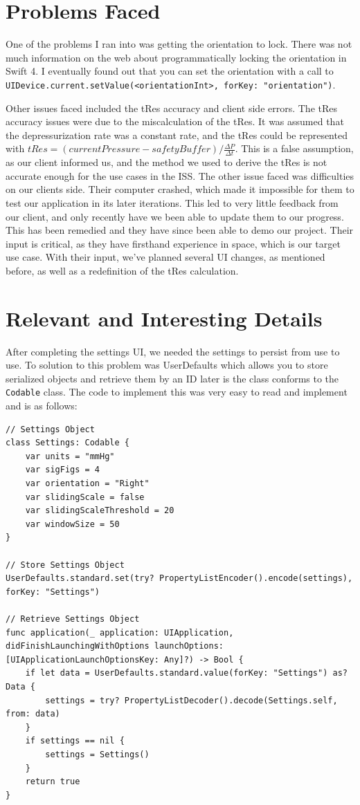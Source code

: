 \documentclass[onecolumn, draftclsnofoot,10pt, compsoc]{IEEEtran}
\begin{document}
\section{Problems Faced}
    One of the problems I ran into was getting the orientation to lock.
    There was not much information on the web about programmatically locking the orientation in Swift 4.
    I eventually found out that you can set the orientation with a call to \texttt{UIDevice.current.setValue(<orientationInt>, forKey: "orientation")}.
    
    Other issues faced included the tRes accuracy and client side errors.
    The tRes accuracy issues were due to the miscalculation of the tRes.
    It was assumed that the depressurization rate was a constant rate, and the tRes could be represented with $tRes=(currentPressure - safetyBuffer) / \frac{\Delta P}{\Delta t}$.
    This is a false assumption, as our client informed us, and the method we used to derive the tRes is not accurate enough for the use cases in the ISS.
    The other issue faced was difficulties on our clients side.
    Their computer crashed, which made it impossible for them to test our application in its later iterations.
    This led to very little feedback from our client, and only recently have we been able to update them to our progress.
    This has been remedied and they have since been able to demo our project.
    Their input is critical, as they have firsthand experience in space, which is our target use case.
    With their input, we've planned several UI changes, as mentioned before, as well as a redefinition of the tRes calculation.

\section{Relevant and Interesting Details}
    After completing the settings UI, we needed the settings to persist from use to use.
    To solution to this problem was UserDefaults which allows you to store serialized objects and retrieve them by an ID later is the class conforms to the \texttt{Codable} class.
    The code to implement this was very easy to read and implement and is as follows:

\begin{lstlisting}
// Settings Object
class Settings: Codable {
    var units = "mmHg"
    var sigFigs = 4
    var orientation = "Right"
    var slidingScale = false
    var slidingScaleThreshold = 20
    var windowSize = 50
}

// Store Settings Object
UserDefaults.standard.set(try? PropertyListEncoder().encode(settings), forKey: "Settings")

// Retrieve Settings Object
func application(_ application: UIApplication, didFinishLaunchingWithOptions launchOptions: [UIApplicationLaunchOptionsKey: Any]?) -> Bool {
    if let data = UserDefaults.standard.value(forKey: "Settings") as? Data {
        settings = try? PropertyListDecoder().decode(Settings.self, from: data)
    }
    if settings == nil {
        settings = Settings()
    }
    return true
}

\end{lstlisting}
\end{document}

